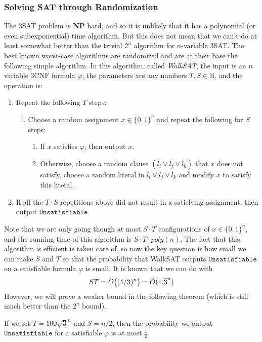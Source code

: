   \subsubsection{Solving SAT through Randomization}
  The 3SAT problem is \textbf{NP} hard, and so it is unlikely that it has a polynomial (or even subexponential) time algorithm. But this does not mean that we can't do at least somewhat better than the trivial $2^n$ algorithm for $n$-variable 3SAT. The best known worst-case algorithms are randomized and are at their base the following simple algorithm. In this algorithm, called \textit{WalkSAT}, the input is an $n$ variable 3CNF formula $\varphi$, the parameters are any numbers $T, S \in \mathbb{N}$, and the operation is: 
  \begin{enumerate}
      \item Repeat the following $T$ steps: 
      \begin{enumerate}
          \item Choose a random assignment $x \in \{0,1\}^n$ and repeat the following for $S$ steps: 
          \begin{enumerate}
              \item If $x$ satisfies $\varphi$, then output $x$. 
              \item Otherwise, choose a random clause $(l_i \vee l_j \vee l_k)$ that $x$ does not satisfy, choose a random literal in $l_i \vee l_j \vee l_k$ and modify $x$ to satisfy this literal. 
          \end{enumerate}
      \end{enumerate}
      \item If all the $T \cdot S$ repetitions above did not result in a satisfying assignment, then output $\texttt{Unsatisfiable}$. 
  \end{enumerate}
  Note that we are only going though at most $S\cdot T$ configurations of $x \in \{0,1\}^n$, and the running time of this algorithm is $S \cdot T \cdot poly(n)$. The fact that this algorithm is efficient is taken care of, so now the key question is how small we can make $S$ and $T$ so that the probability that WalkSAT outputs $\texttt{Unsatisfiable}$ on a satisfiable formula $\varphi$ is small. It is known that we can do with 
  \[ST = \Tilde{O} \big( (4/3)^n \big) = \Tilde{O} ( 1.\overline{3}^n)\]
  However, we will prove a weaker bound in the following theorem (which is still much better than the $2^n$ bound). 

  \begin{theorem}
  If we set $T = 100\sqrt{3}^n$ and $S = n/2$, then the probability we output $\texttt{Unsatisfiable}$ for a satisfiable $\varphi$ is at most $\frac{1}{2}$. 
  \end{theorem}

